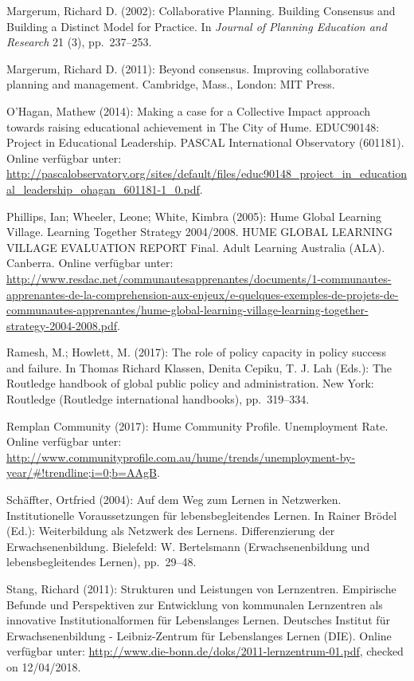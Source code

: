 \documentclass[a4paper,
fontsize=11pt,
oneside,
numbers=noperiodatend,
parskip=half-,
bibliography=totoc,
final
]{scrartcl}
\begin{document}
Margerum, Richard D. (2002): Collaborative Planning. Building Consensus
and Building a Distinct Model for Practice. In \emph{Journal of Planning
Education and Research} 21 (3), pp.~237--253.

Margerum, Richard D. (2011): Beyond consensus. Improving collaborative
planning and management. Cambridge, Mass., London: MIT Press.

O'Hagan, Mathew (2014): Making a case for a Collective Impact approach
towards raising educational achievement in The City of Hume. EDUC90148:
Project in Educational Leadership. PASCAL International Observatory
(601181). Online verfügbar unter:
\url{http://pascalobservatory.org/sites/default/files/educ90148_project_in_educational_leadership_ohagan_601181-1_0.pdf}.

Phillips, Ian; Wheeler, Leone; White, Kimbra (2005): Hume Global
Learning Village. Learning Together Strategy 2004/2008. HUME GLOBAL
LEARNING VILLAGE EVALUATION REPORT Final. Adult Learning Australia
(ALA). Canberra. Online verfügbar unter:
\url{http://www.resdac.net/communautesapprenantes/documents/1-communautes-apprenantes-de-la-comprehension-aux-enjeux/e-quelques-exemples-de-projets-de-communautes-apprenantes/hume-global-learning-village-learning-together-strategy-2004-2008.pdf}.

Ramesh, M.; Howlett, M. (2017): The role of policy capacity in policy
success and failure. In Thomas Richard Klassen, Denita Cepiku, T. J. Lah
(Eds.): The Routledge handbook of global public policy and
administration. New York: Routledge (Routledge international handbooks),
pp.~319--334.

Remplan Community (2017): Hume Community Profile. Unemployment Rate.
Online verfügbar unter:
\url{http://www.communityprofile.com.au/hume/trends/unemployment-by-year/\#!trendline;i=0;b=AAgB}.

Schäffter, Ortfried (2004): Auf dem Weg zum Lernen in Netzwerken.
Institutionelle Voraussetzungen für lebensbegleitendes Lernen. In Rainer
Brödel (Ed.): Weiterbildung als Netzwerk des Lernens. Differenzierung
der Erwachsenenbildung. Bielefeld: W. Bertelsmann (Erwachsenenbildung
und lebensbegleitendes Lernen), pp.~29--48.

Stang, Richard (2011): Strukturen und Leistungen von Lernzentren.
Empirische Befunde und Perspektiven zur Entwicklung von kommunalen
Lernzentren als innovative Institutionalformen für Lebenslanges Lernen.
Deutsches Institut für Erwachsenenbildung - Leibniz-Zentrum für
Lebenslanges Lernen (DIE). Online verfügbar unter:
\url{http://www.die-bonn.de/doks/2011-lernzentrum-01.pdf}, checked on
12/04/2018.
\end{document}
